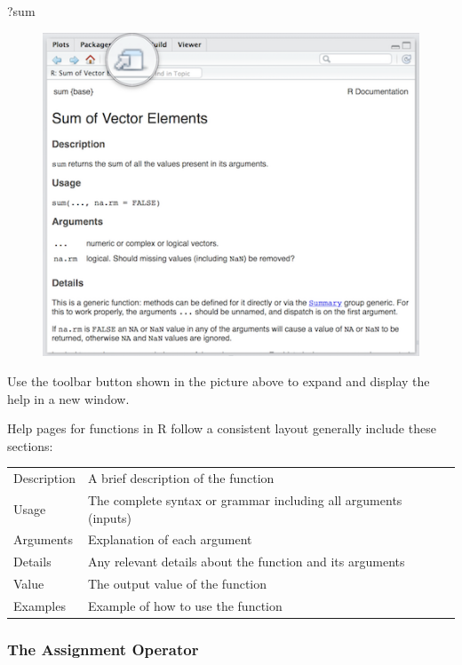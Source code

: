 \documentclass[]{article}
\newenvironment{Shaded}{\begin{snugshade}}{\end{snugshade}}
\newcommand{\NormalTok}[1]{#1}
\theoremstyle{definition}
\theoremstyle{definition}
\theoremstyle{definition}
\theoremstyle{remark}
\begin{document}
\begin{Shaded}
\begin{Highlighting}[]
\NormalTok{?sum}
\end{Highlighting}
\end{Shaded}

\begin{figure}
\centering
\includegraphics{./img/rstudio_help.png}
\caption{}
\end{figure}

Use the toolbar button shown in the picture above to expand and display
the help in a new window.

Help pages for functions in R follow a consistent layout generally
include these sections:

\begin{longtable}[]{@{}ll@{}}
\toprule
Description & A brief description of the function\tabularnewline
Usage & The complete syntax or grammar including all arguments
(inputs)\tabularnewline
Arguments & Explanation of each argument\tabularnewline
Details & Any relevant details about the function and its
arguments\tabularnewline
Value & The output value of the function\tabularnewline
Examples & Example of how to use the function\tabularnewline
\bottomrule
\end{longtable}

\subsubsection{The Assignment Operator}\label{the-assignment-operator}
\end{document}
